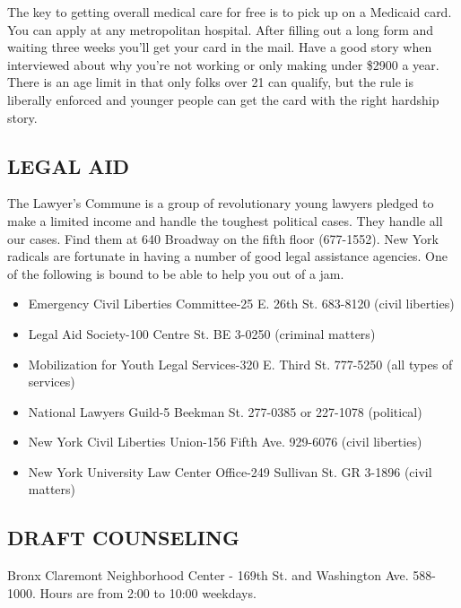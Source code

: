 \documentclass[11pt,twoside,a4paper]{book}
\begin{document}
The key to getting overall medical care for free is to pick up on a Medicaid card. You can apply at any metropolitan hospital. After filling out a long form and waiting three weeks you'll get your card in the mail. Have a good story when interviewed about why you're not working or only making under \$2900 a year. There is an age limit in that only folks over 21 can qualify, but the rule is liberally enforced and younger people can get the card with the right hardship story.~\\

\subsection{LEGAL AID}
The Lawyer's Commune is a group of revolutionary young lawyers pledged to make a limited income and handle the toughest political cases. They handle all our cases. Find them at 640 Broadway on the fifth floor (677-1552). New York radicals are fortunate in having a number of good legal assistance agencies. One of the following is bound to be able to help you out of a jam.~\\
\begin{itemize}
\item Emergency Civil Liberties Committee-25 E. 26th St. 683-8120 (civil liberties) 
\item Legal Aid Society-100 Centre St. BE 3-0250 (criminal matters) 
\item Mobilization for Youth Legal Services-320 E. Third St. 777-5250 (all types of services) 
\item National Lawyers Guild-5 Beekman St. 277-0385 or 227-1078 (political) \item New York Civil Liberties Union-156 Fifth Ave. 929-6076 (civil liberties) 
\item New York University Law Center Office-249 Sullivan St. GR 3-1896 (civil matters)
\end{itemize}

\subsection{DRAFT COUNSELING}
Bronx 
Claremont Neighborhood Center - 169th St. and Washington Ave. 588-1000. Hours are from 2:00 to 10:00 weekdays.~\\
\end{document}
